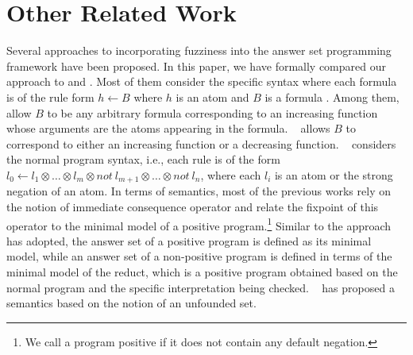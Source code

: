 \documentclass[runningheads]{llncs}
\def\fand{\otimes}
\begin{document}
\section{Other Related Work} \label{sec:related_work} 

Several approaches to incorporating fuzziness into the answer
set programming framework have been proposed. In this paper, we have
formally compared our approach to \cite{schockaert12fuzzy} and
\cite{lukasiewicz06fuzzy}.
Most of them consider the specific syntax where each
formula is of the rule form $h\leftarrow B$ where $h$ is an atom and
$B$ is a formula
\cite{vojtas01fuzzy,damasio01monotonic,medina01multi-adjoint,damasio01antitonic}. 
Among them, \cite{vojtas01fuzzy,damasio01monotonic,medina01multi-adjoint} allow $B$ to be any arbitrary formula
corresponding to an increasing function whose arguments are the atoms
appearing in the formula. ~\cite{damasio01antitonic} allows $B$
to correspond to either an increasing function or a decreasing
function. ~\cite{madrid08towards} considers the normal program
syntax, i.e., each rule is of the form $l_0 \leftarrow l_1 \fand \dots
\fand l_m \fand not\ l_{m+1} \fand \dots \fand not\ l_{n}$, where each
$l_i$ is an atom or the strong negation of an atom. In terms of
semantics, most of the previous works rely on the notion of immediate
consequence operator and relate the fixpoint of this operator to the
minimal model of a positive program.\footnote{We call a program
  positive if it does not contain any default negation.} Similar to
the approach ~\cite{lukasiewicz06fuzzy} has adopted, the answer set of
a positive program is defined as its minimal model, while an answer
set of a non-positive program is defined in terms of the minimal model
of the reduct, which is a positive program obtained based on the
normal program and the specific interpretation being
checked. ~\cite{nieuwenborgh07anintroduction} has proposed a semantics based on
the notion of an unfounded set.
\end{document}
